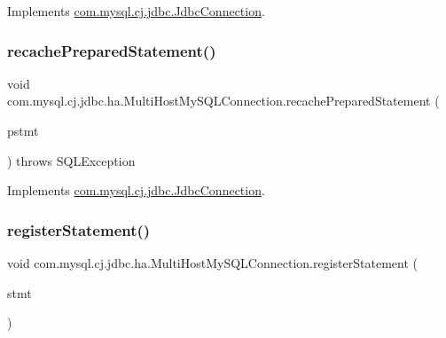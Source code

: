 Implements \mbox{\hyperlink{interfacecom_1_1mysql_1_1cj_1_1jdbc_1_1_jdbc_connection_af5f24cb10cfc14e0174c6bb115745bc0}{com.\+mysql.\+cj.\+jdbc.\+Jdbc\+Connection}}.

\mbox{\label{classcom_1_1mysql_1_1cj_1_1jdbc_1_1ha_1_1_multi_host_my_s_q_l_connection_a861ff794887b4e5d0cd1ae1d2477bd9b}} 
\subsubsection{\texorpdfstring{recache\+Prepared\+Statement()}{recachePreparedStatement()}}
{\footnotesize\ttfamily void com.\+mysql.\+cj.\+jdbc.\+ha.\+Multi\+Host\+My\+S\+Q\+L\+Connection.\+recache\+Prepared\+Statement (\begin{DoxyParamCaption}\item[{\mbox{\hyperlink{interfacecom_1_1mysql_1_1cj_1_1jdbc_1_1_jdbc_prepared_statement}{Jdbc\+Prepared\+Statement}}}]{pstmt }\end{DoxyParamCaption}) throws S\+Q\+L\+Exception}



Implements \mbox{\hyperlink{interfacecom_1_1mysql_1_1cj_1_1jdbc_1_1_jdbc_connection_a24f00ff038a4f01aab9dea9e2817c084}{com.\+mysql.\+cj.\+jdbc.\+Jdbc\+Connection}}.

\mbox{\label{classcom_1_1mysql_1_1cj_1_1jdbc_1_1ha_1_1_multi_host_my_s_q_l_connection_a1e99a20f35612593a661ee558af5fe4a}} 
\subsubsection{\texorpdfstring{register\+Statement()}{registerStatement()}}
{\footnotesize\ttfamily void com.\+mysql.\+cj.\+jdbc.\+ha.\+Multi\+Host\+My\+S\+Q\+L\+Connection.\+register\+Statement (\begin{DoxyParamCaption}\item[{\mbox{\hyperlink{interfacecom_1_1mysql_1_1cj_1_1jdbc_1_1_jdbc_statement}{com.\+mysql.\+cj.\+jdbc.\+Jdbc\+Statement}}}]{stmt }\end{DoxyParamCaption})}

